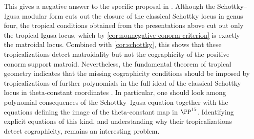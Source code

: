 \documentclass[11pt,letterpaper]{amsart}
\begin{document}
 This gives a negative answer to the specific
proposal in \cite[Question~4.10]{chua2019schottky}. Although the Schottky--Igusa modular form cuts out the closure of the classical Schottky locus in genus four, the tropical conditions obtained from the presentations above cut out only the tropical Igusa locus, which by \cref{cor:nonnegative-conorm-criterion} is exactly the matroidal locus. Combined with \cref{cor:schottky}, this shows that these tropicalizations detect matroidality but not the cographicity of the positive conorm support matroid. Nevertheless, the fundamental theorem of tropical geometry indicates that the missing cographicity conditions should be imposed by tropicalizations of further polynomials in the full ideal of the classical Schottky locus in theta-constant coordinates \cite{maclagan2015introduction}. In particular, one should look among polynomial consequences of the Schottky--Igusa equation together with the equations defining the image of the theta-constant map in $\PP^{15}$. Identifying explicit equations of this kind, and understanding why their tropicalizations detect cographicity, remains an interesting problem.


{\small
}

\end{document}

